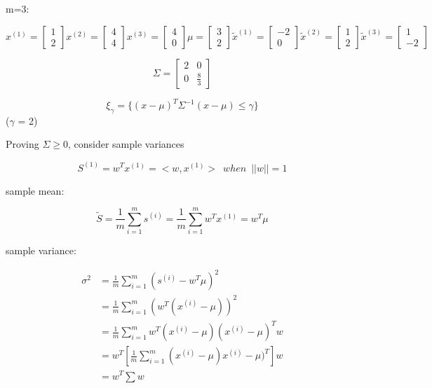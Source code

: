 m=3:

$$x^{(1)} =
\left[
\begin{matrix}
1\\
2
\end{matrix}
\right]x^{(2)} =
\left[
\begin{matrix}
4\\
4
\end{matrix}
\right]x^{(3)} =
\left[
\begin{matrix}
4\\
0
\end{matrix}
\right]\mu =
\left[
\begin{matrix}
3\\
2
\end{matrix}
\right]\tilde{x}^{(1)} =
\left[
\begin{matrix}
-2\\
0
\end{matrix}
\right]\tilde{x}^{(2)} =
\left[
\begin{matrix}
1\\
2
\end{matrix}
\right]\tilde{x}^{(3)} =
\left[
\begin{matrix}
1\\
-2
\end{matrix}
\right]
$$



$$\Sigma = 
\left[
\begin{matrix}
2&0\\
0&\frac{8}{3}
\end{matrix}
\right]
$$

\begin{equation*}
\xi_{\gamma} = \{(x - \mu)^T \Sigma^{-1}(x - \mu)\leq \gamma \}
\end{equation*}
($\gamma$ = 2)

Proving $\Sigma\geq 0$, consider sample variances

\begin{equation*}
S^{(1)} =w^Tx^{(1)} = <w, x^{(1)}>\,\,\, when \,\,\, ||w|| = 1
\end{equation*}

sample mean:

\begin{equation*}
\tilde{S} = \frac{1}{m}\sum^m_{i=1}s^{(i)} = \frac{1}{m}\sum^m_{i=1}w^Tx^{(1)} = w^T\mu
\end{equation*}



sample variance: 

\begin{align*}
\sigma^2 &= \frac{1}{m}\sum^m_{i=1}(s^{(i)} - w^T\mu)^2 \\
&= \frac{1}{m}\sum^m_{i=1}(w^T(x^{(i)} -\mu))^2\\
&=\frac{1}{m}\sum^m_{i=1}w^T(x^{(i)}-\mu)(x^{(i)}-\mu)^Tw\\
&= w^T[\frac{1}{m}\sum^m_{i=1}(x^{(i)}-\mu)x^{(i)}-\mu)^T]w\\
&= w^T\sum w
\end{align*}



